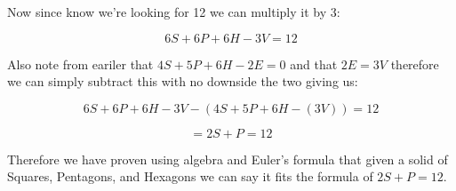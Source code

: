 \documentclass{article}
\begin{document}
\begin{enumerate}
    Now since know we're looking for 12 we can multiply it by 3:

    \[6S + 6P + 6H - 3V = 12\]

    Also note from eariler that $4S + 5P + 6H - 2E = 0$ and that $2E = 3V$ therefore we can simply subtract this with no downside the two giving us:

    \[6S + 6P + 6H - 3V - (4S + 5P + 6H - (3V)) = 12\]

    \[= 2S + P = 12\]

    Therefore we have proven using algebra and Euler's formula that given a solid of Squares, Pentagons, and Hexagons we can say it fits the formula of $2S + P = 12$.

  \end{enumerate}
\end{document}

